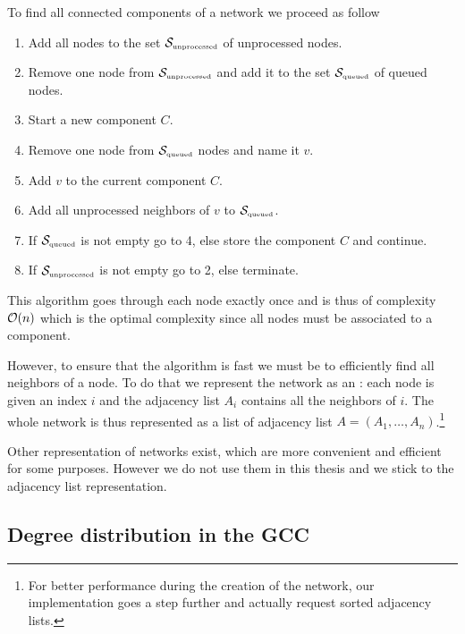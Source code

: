 \documentclass[
11pt, %
english, %
singlespacing, %
nolistspacing, %
liststotoc, %
headsepline, %
]{MastersDoctoralThesis} %
\begin{document}
To find all connected components of a network we proceed as follow
\begin{enumerate}
	\item Add all nodes to the set $\mathcal{S}_{\text{\tiny unprocessed}}$ of unprocessed nodes.
	\item Remove one node from $\mathcal{S}_{\text{\tiny unprocessed}}$ and add it to the set $\mathcal{S}_{\text{\tiny queued}}$ of queued nodes.
	\item Start a new component $C$.
	\item Remove one node from $\mathcal{S}_{\text{\tiny queued}}$ nodes and name it $v$.
	\item Add $v$ to the current component $C$.
	\item Add all unprocessed neighbors of $v$ to $\mathcal{S}_{\text{\tiny queued}}$.
	\item If $\mathcal{S}_{\text{\tiny queued}}$ is not empty go to 4, else store the component $C$ and continue.
	\item If $\mathcal{S}_{\text{\tiny unprocessed}}$ is not empty go to 2, else terminate.
\end{enumerate}
This algorithm goes through each node exactly once and is thus of complexity $\mathcal{O}\!\left(n\right)$ which is the optimal complexity since all nodes must be associated to a component.

However, to ensure that the algorithm is fast we must be to efficiently find all neighbors of a node. To do that we represent the network as an : each node is given an index $i$ and the adjacency list $A_i$ contains all the neighbors of $i$. The whole network is thus represented as a list of adjacency list $A = (A_1, \dots, A_n)$.\footnote{For better performance during the creation of the network, our implementation goes a step further and actually request sorted adjacency lists.}

Other representation of networks exist, which are more convenient and efficient for some purposes. However we do not use them in this thesis and we stick to the adjacency list representation.

\subsection{Degree distribution in the GCC}
\label{Section: Degree distribution in the GCC}
\end{document}
